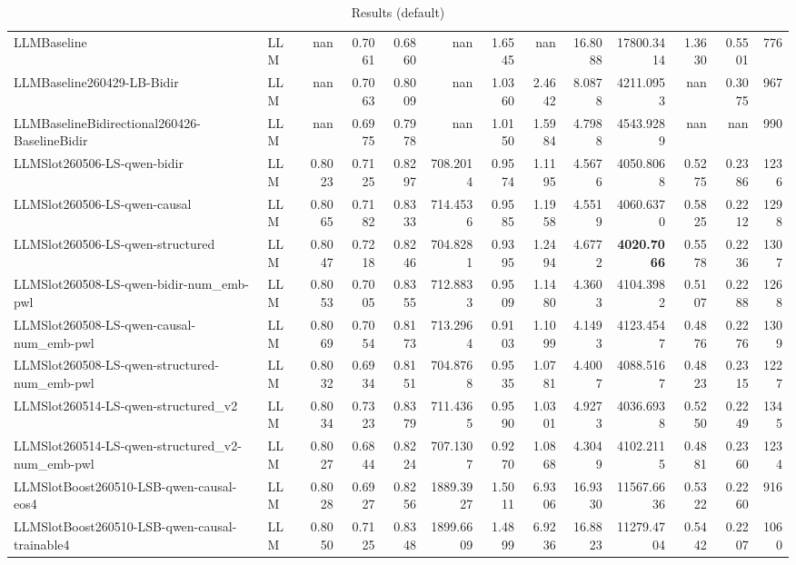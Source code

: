 \begin{table}[htbp]
{\begin{tabular}{ll|rrrrrrrrrr|r}
LLMBaseline & LLM & nan & 0.7061 & 0.6860 & nan & 1.6545 & nan & 16.8088 & 17800.3414 & 1.3630 & 0.5501 & 776 \\
LLMBaseline260429-LB-Bidir & LLM & nan & 0.7063 & 0.8009 & nan & 1.0360 & 2.4642 & 8.0878 & 4211.0953 & nan & 0.3075 & 967 \\
LLMBaselineBidirectional260426-BaselineBidir & LLM & nan & 0.6975 & 0.7978 & nan & 1.0150 & 1.5984 & 4.7988 & 4543.9289 & nan & nan & 990 \\
LLMSlot260506-LS-qwen-bidir & LLM & 0.8023 & 0.7125 & 0.8297 & 708.2014 & 0.9574 & 1.1195 & 4.5676 & 4050.8068 & 0.5275 & 0.2386 & 1236 \\
LLMSlot260506-LS-qwen-causal & LLM & 0.8065 & 0.7182 & 0.8333 & 714.4536 & 0.9585 & 1.1958 & 4.5519 & 4060.6370 & 0.5825 & 0.2212 & 1298 \\
LLMSlot260506-LS-qwen-structured & LLM & 0.8047 & 0.7218 & 0.8246 & 704.8281 & 0.9395 & 1.2494 & 4.6772 & \textbf{4020.7066} & 0.5578 & 0.2236 & 1307 \\
LLMSlot260508-LS-qwen-bidir-num\_emb-pwl & LLM & 0.8053 & 0.7005 & 0.8355 & 712.8833 & 0.9509 & 1.1480 & 4.3603 & 4104.3982 & 0.5107 & 0.2288 & 1268 \\
LLMSlot260508-LS-qwen-causal-num\_emb-pwl & LLM & 0.8069 & 0.7054 & 0.8173 & 713.2964 & 0.9103 & 1.1099 & 4.1493 & 4123.4547 & 0.4876 & 0.2276 & 1309 \\
LLMSlot260508-LS-qwen-structured-num\_emb-pwl & LLM & 0.8032 & 0.6934 & 0.8151 & 704.8768 & 0.9535 & 1.0781 & 4.4007 & 4088.5167 & 0.4823 & 0.2315 & 1227 \\
LLMSlot260514-LS-qwen-structured\_v2 & LLM & 0.8034 & 0.7323 & 0.8379 & 711.4365 & 0.9590 & 1.0301 & 4.9273 & 4036.6938 & 0.5250 & 0.2249 & 1345 \\
LLMSlot260514-LS-qwen-structured\_v2-num\_emb-pwl & LLM & 0.8027 & 0.6844 & 0.8224 & 707.1307 & 0.9270 & 1.0868 & 4.3049 & 4102.2115 & 0.4881 & 0.2360 & 1234 \\
LLMSlotBoost260510-LSB-qwen-causal-eos4 & LLM & 0.8028 & 0.6927 & 0.8256 & 1889.3927 & 1.5011 & 6.9306 & 16.9330 & 11567.6636 & 0.5322 & 0.2260 & 916 \\
LLMSlotBoost260510-LSB-qwen-causal-trainable4 & LLM & 0.8050 & 0.7125 & 0.8348 & 1899.6609 & 1.4899 & 6.9236 & 16.8823 & 11279.4704 & 0.5442 & 0.2207 & 1060 \\
\bottomrule
\end{tabular}
}
\caption{Results (default)}
\label{tab:results_default}
\end{table}